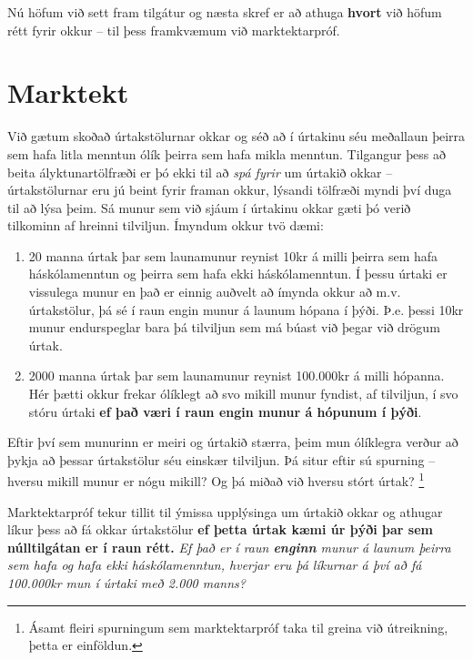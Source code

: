 \documentclass[
]{book}
\providecommand{\tightlist}{%
  \setlength{\itemsep}{0pt}\setlength{\parskip}{0pt}}
\begin{document}
Nú höfum við sett fram tilgátur og næsta skref er að athuga \textbf{hvort}
við höfum rétt fyrir okkur -- til þess framkvæmum við marktektarpróf.

\hypertarget{marktekt}{%
\chapter{Marktekt}\label{marktekt}}

Við gætum skoðað úrtakstölurnar okkar og séð að í úrtakinu séu meðallaun þeirra sem hafa litla menntun ólík þeirra sem hafa mikla menntun. Tilgangur þess að beita ályktunartölfræði er þó ekki til að \emph{spá fyrir} um úrtakið okkar -- úrtakstölurnar eru jú beint fyrir framan okkur, lýsandi tölfræði myndi því duga til að lýsa þeim. Sá munur sem við sjáum í úrtakinu okkar gæti þó verið tilkominn af hreinni tilviljun. Ímyndum okkur tvö dæmi:

\begin{enumerate}
\def\labelenumi{\arabic{enumi}.}
\tightlist
\item
  20 manna úrtak þar sem launamunur reynist 10kr á milli þeirra sem hafa háskólamenntun og þeirra sem hafa ekki háskólamenntun. Í þessu úrtaki er vissulega munur en það er einnig auðvelt að ímynda okkur að m.v. úrtakstölur, þá sé í raun engin munur á launum hópana í þýði. Þ.e. þessi 10kr munur endurspeglar bara þá tilviljun sem má búast við þegar við drögum úrtak.
\item
  2000 manna úrtak þar sem launamunur reynist 100.000kr á milli hópanna. Hér þætti okkur frekar ólíklegt að svo mikill munur fyndist, af tilviljun, í svo stóru úrtaki \textbf{ef það væri í raun engin munur á hópunum í þýði}.
\end{enumerate}

Eftir því sem munurinn er meiri og úrtakið stærra, þeim mun ólíklegra verður að þykja að þessar úrtakstölur séu einskær tilviljun. Þá situr eftir sú spurning -- hversu mikill munur er nógu mikill? Og þá miðað við hversu stórt úrtak? \footnote{Ásamt fleiri spurningum sem marktektarpróf taka til greina við útreikning, þetta er einföldun.}

Marktektarpróf tekur tillit til ýmissa upplýsinga um úrtakið okkar og athugar líkur þess að fá okkar úrtakstölur \textbf{ef þetta úrtak kæmi úr þýði þar sem núlltilgátan er í raun rétt.} \emph{Ef það er í raun \textbf{enginn} munur á launum þeirra sem hafa og hafa ekki háskólamenntun, hverjar eru þá líkurnar á því að fá 100.000kr mun í úrtaki með 2.000 manns?}
\end{document}
